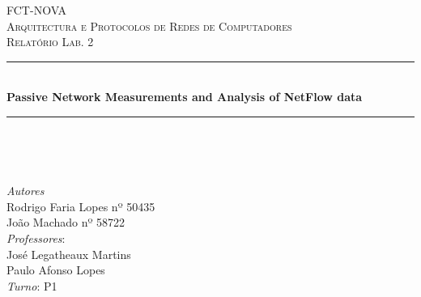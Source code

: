 \documentclass[12pt,a4paper]{report}
\title{\mytitle}
\author{\myauthor}
\date{\mydate}
\begin{document}
\begin{titlepage} %
	\newcommand{\HRule}{\rule{\linewidth}{0.5mm}} %
	
	\center %
	
	
	\textsc{\LARGE FCT-NOVA}\\[1.5cm] %
	
	\textsc{\Large Arquitectura e Protocolos de Redes de Computadores}\\[0.5cm] %
	
	\textsc{\large Relatório Lab. 2}\\[0.5cm] %
	
	
	\HRule\\[0.4cm]
	
	{\huge\bfseries Passive Network Measurements and Analysis of NetFlow data}\\[0.4cm] %
	
	\HRule\\[1.5cm]
	
	
	\begin{minipage}{0.3\textwidth}
		\begin{flushleft}
			\large
			
		\end{flushleft}
	\end{minipage}
	~
	\begin{minipage}{0.6\textwidth}
		\begin{flushright}
			\large
			\textit{Autores}
			\\
			Rodrigo Faria Lopes nº 50435 %
			\\
			João Machado nº 58722 %
			\\
			\textit{Professores}:
			\\
			José Legatheaux Martins\\
			Paulo Afonso Lopes
			\\
			\textit{Turno}: P1
		\end{flushright}
	\end{minipage}
	

\end{titlepage}
\end{document}
